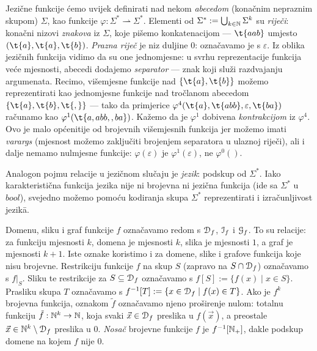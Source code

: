 Jezične funkcije ćemo uvijek definirati nad nekom \emph{abecedom} (konačnim nepraznim skupom) $\Sigma$, kao funkcije $\varphi:\Sigma^*\rightharpoonup\Sigma^*$. Elementi od $\Sigma^*:=\bigcup_{k\in{\mathbb N}}\Sigma^k$ su \emph{riječi}: konačni nizovi \emph{znakova} iz $\Sigma$, koje pišemo konkatenacijom --- $\t{aab}$ umjesto $(\t{a},\t{a},\t{b})$. \emph{Prazna riječ} je niz duljine $0$: označavamo je s $\varepsilon$. Iz oblika jezičnih funkcija vidimo da su one jednomjesne: u svrhu reprezentacije funkcija veće mjesnosti, abecedi dodajemo \emph{separator} --- znak koji služi razdvajanju argumenata. Recimo, višemjesne funkcije nad $\{\t{a},\t{b}\}$ možemo reprezentirati kao jednomjesne funkcije nad tročlanom abecedom $\{\t{a},\t{b},\t{,}\}$ --- tako da primjerice $\varphi^4(\t{a},\t{abb},\varepsilon,\t{ba})$ računamo kao $\varphi^1(\t{a{},{}a{}b{}b{},{},{}b{}a})$. Kažemo da je $\varphi^1$ dobivena \emph{kontrakcijom} iz $\varphi^4$. Ovo je malo općenitije od brojevnih višemjesnih funkcija jer možemo imati \emph{varargs} (mjesnost možemo zaključiti brojenjem separatora u ulaznoj ri\-je\-či), ali i dalje nemamo nulmjesne funkcije: $\varphi(\varepsilon)$ je $\varphi^1(\varepsilon)$, ne $\varphi^0()$. %

Analogon pojmu relacije u jezičnom slučaju je \emph{jezik}: podskup od $\Sigma^*$. Iako karakteristična funkcija jezika nije ni brojevna ni jezična funkcija (ide sa $\Sigma^*$ u $bool$), svejedno možemo pomoću kodiranja skupa $\Sigma^*$ reprezentirati i izračunljivost jezik\=a. %

Domenu, sliku i graf funkcije $f$ označavamo redom s $\mathcal D_{f}$, $\mathcal I_{f}$ i $\mathcal G_{f}$. To su relacije: za funkciju mjesnosti $k$, domena je mjesnosti $k$, slika je mjesnosti $1$, a graf je mjesnosti $k+1$. Iste oznake koristimo i za domene, slike i grafove funkcija koje nisu brojevne. Restrikciju funkcije $f$ na skup $S$ (zapravo na $S\cap\mathcal D_{f}$) označavamo s $f|_S$. Sliku te restrikcije za $S\subseteq\mathcal D_{f}$ označavamo s $f[S]:=\{f(x)\mid x\in S\}$. Prasliku skupa $T$ označavamo s $f^{-1}[T]:=\{x\in\mathcal D_{f}\mid f(x)\in T\}$. Ako je $f^k$ brojevna funkcija, oznakom $\tilde f$ označavamo njeno proširenje nulom: totalnu funkciju $\tilde{f}:{\mathbb N}^k\to{\mathbb N}$, koja svaki $\vec x\in\mathcal D_{f}$ preslika u $f(\vec x)$, a preostale $\vec x\in{\mathbb N}^k\setminus\mathcal D_{f}$ preslika u $0$. \emph{Nosač} brojevne funkcije $f$ je $f^{-1}[{\mathbb N}_+]$, dakle podskup domene na kojem $f$ nije $0$.

